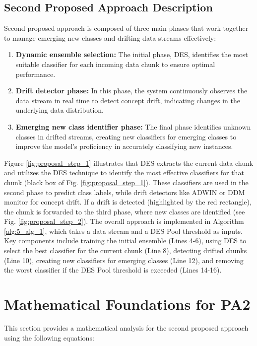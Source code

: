\subsection{Second Proposed Approach Description}
\label{proposed_overview}
Second proposed approach is composed of three main phases that work together to manage emerging new classes and drifting data streams effectively:
\begin{enumerate}
	\item \textbf{Dynamic ensemble selection:} The initial phase, DES, identifies the most suitable classifier for each incoming data chunk to ensure optimal performance.
	\item \textbf{Drift detector phase:} In this phase, the system continuously observes the data stream in real time to detect concept drift, indicating changes in the underlying data distribution.
	\item \textbf{Emerging new class identifier phase:} The final phase identifies unknown classes in drifted streams, creating new classifiers for emerging classes to improve the model's proficiency in accurately classifying new instances.
\end{enumerate}
Figure \ref{fig:proposal_step_1} illustrates that DES extracts the current data chunk and utilizes the DES technique to identify the most effective classifiers for that chunk (black box of Fig. \ref{fig:proposal_step_1}). These classifiers are used in the second phase to predict class labels, while drift detectors like ADWIN or DDM monitor for concept drift. If a drift is detected (highlighted by the red rectangle), the chunk is forwarded to the third phase, where new classes are identified (see Fig. \ref{fig:proposal_step_2}). The overall approach is implemented in Algorithm \ref{alg:5_alg_1}, which takes a data stream and a DES Pool threshold as inputs. Key components include training the initial ensemble (Lines 4-6), using DES to select the best classifier for the current chunk (Line 8), detecting drifted chunks (Line 10), creating new classifiers for emerging classes (Line 12), and removing the worst classifier if the DES Pool threshold is exceeded (Lines 14-16).

\section{Mathematical Foundations for PA2}

This section provides a mathematical analysis for the second proposed approach using the following equations:

